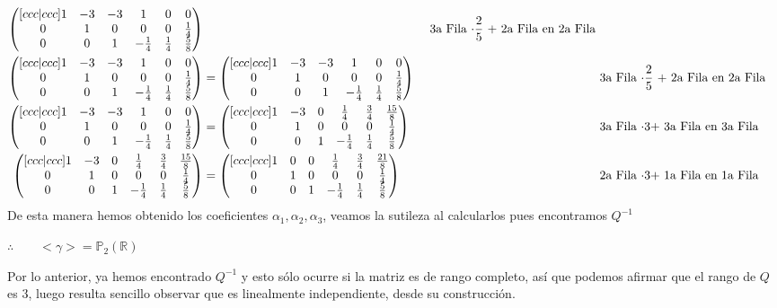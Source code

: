\documentclass[letterpaper]{article}
\newcommand{\Po}{\mathds{P}_2(\mathds{R})}
\renewcommand{\*}{\cdot}
\theoremstyle{definition}
\begin{document}
\begin{align*}
\begin{pmatrix}[ccc|ccc]
	1 & -3 & -3 & 1 & 0 & 0\\
	0 & 1 & 0 & 0 & 0 & \frac{1}{4}\\
	0 & 0 & 1 & -\frac{1}{4} & \frac{1}{4} & \frac{5}{8}
	\end{pmatrix} && \text{ 3a Fila $ \* \frac{2}{5}$ + 2a Fila en 2a Fila}\\
	\begin{pmatrix}[ccc|ccc]
	1 & -3 & -3 & 1 & 0 & 0\\
	0 & 1 & 0 & 0 & 0 & \frac{1}{4}\\
	0 & 0 & 1 & -\frac{1}{4} & \frac{1}{4} & \frac{5}{8}
	\end{pmatrix} &= \begin{pmatrix}[ccc|ccc]
	1 & -3 & -3 & 1 & 0 & 0\\
	0 & 1 & 0 & 0 & 0 & \frac{1}{4}\\
	0 & 0 & 1 & -\frac{1}{4} & \frac{1}{4} & \frac{5}{8}
	\end{pmatrix} && \text{ 3a Fila $ \* \frac{2}{5}$ + 2a Fila en 2a Fila}\\
	\begin{pmatrix}[ccc|ccc]
	1 & -3 & -3 & 1 & 0 & 0\\
	0 & 1 & 0 & 0 & 0 & \frac{1}{4}\\
	0 & 0 & 1 & -\frac{1}{4} & \frac{1}{4} & \frac{5}{8}
	\end{pmatrix} & = \begin{pmatrix}[ccc|ccc]
	1 & -3 & 0 & \frac{1}{4} &\frac{3}{4} & \frac{15}{8} \\
	0 & 1 & 0 & 0 & 0 & \frac{1}{4}\\
	0 & 0 & 1 & -\frac{1}{4} & \frac{1}{4} & \frac{5}{8}
	\end{pmatrix} && \text{ 3a Fila $ \* 3 + $  3a Fila en 3a Fila}\\
	\begin{pmatrix}[ccc|ccc]
	1 & -3 & 0 & \frac{1}{4} &\frac{3}{4} & \frac{15}{8} \\
	0 & 1 & 0 & 0 & 0 & \frac{1}{4}\\
	0 & 0 & 1 & -\frac{1}{4} & \frac{1}{4} & \frac{5}{8}
	\end{pmatrix} & = \begin{pmatrix}[ccc|ccc]
	1 & 0 & 0 & \frac{1}{4} &\frac{3}{4} & \frac{21}{8} \\
	0 & 1 & 0 & 0 & 0 & \frac{1}{4}\\
	0 & 0 & 1 & -\frac{1}{4} & \frac{1}{4} & \frac{5}{8}
	\end{pmatrix}&& \text{ 2a Fila $ \* 3 + $  1a Fila en 1a Fila}\\
\end{align*}
De esta manera hemos obtenido los coeficientes $ \alpha_1, \alpha_2, \alpha_3 $, veamos la sutileza al calcularlos pues encontramos $ Q^{-1} $
\begin{center}
	$ \therefore \qquad <\gamma> = \Po $
\end{center}
Por lo anterior, ya hemos encontrado $ Q^{-1} $ y esto sólo ocurre si la matriz es de rango completo, así que podemos afirmar que el rango de $ Q $ es 3, luego resulta sencillo observar que es linealmente independiente, desde su construcción.\\
\end{document}
